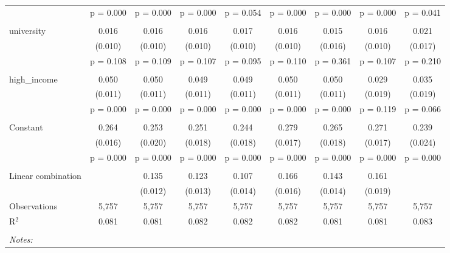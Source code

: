 \begin{table}[!htbp]
\begin{tabular}{@{\extracolsep{5pt}}lcccccccc}
  & p = 0.000 & p = 0.000 & p = 0.000 & p = 0.054 & p = 0.000 & p = 0.000 & p = 0.000 & p = 0.041 \\ 
  & & & & & & & & \\ 
 university & 0.016 & 0.016 & 0.016 & 0.017 & 0.016 & 0.015 & 0.016 & 0.021 \\ 
  & (0.010) & (0.010) & (0.010) & (0.010) & (0.010) & (0.016) & (0.010) & (0.017) \\ 
  & p = 0.108 & p = 0.109 & p = 0.107 & p = 0.095 & p = 0.110 & p = 0.361 & p = 0.107 & p = 0.210 \\ 
  & & & & & & & & \\ 
 high\_income & 0.050 & 0.050 & 0.049 & 0.049 & 0.050 & 0.050 & 0.029 & 0.035 \\ 
  & (0.011) & (0.011) & (0.011) & (0.011) & (0.011) & (0.011) & (0.019) & (0.019) \\ 
  & p = 0.000 & p = 0.000 & p = 0.000 & p = 0.000 & p = 0.000 & p = 0.000 & p = 0.119 & p = 0.066 \\ 
  & & & & & & & & \\ 
 Constant & 0.264 & 0.253 & 0.251 & 0.244 & 0.279 & 0.265 & 0.271 & 0.239 \\ 
  & (0.016) & (0.020) & (0.018) & (0.018) & (0.017) & (0.018) & (0.017) & (0.024) \\ 
  & p = 0.000 & p = 0.000 & p = 0.000 & p = 0.000 & p = 0.000 & p = 0.000 & p = 0.000 & p = 0.000 \\ 
  & & & & & & & & \\ 
Linear combination &   & 0.135 & 0.123 & 0.107 & 0.166 & 0.143 & 0.161 &  \\ 
 &  & (0.012) & (0.013) & (0.014) & (0.016) & (0.014) & (0.019) &  \\ 
Observations & 5,757 & 5,757 & 5,757 & 5,757 & 5,757 & 5,757 & 5,757 & 5,757 \\ 
R$^{2}$ & 0.081 & 0.081 & 0.082 & 0.082 & 0.082 & 0.081 & 0.081 & 0.083 \\ 
\hline \\[-1.8ex] 
\textit{Notes:} & \multicolumn{8}{l}{} \\ 
\end{tabular} 
\end{table}  
